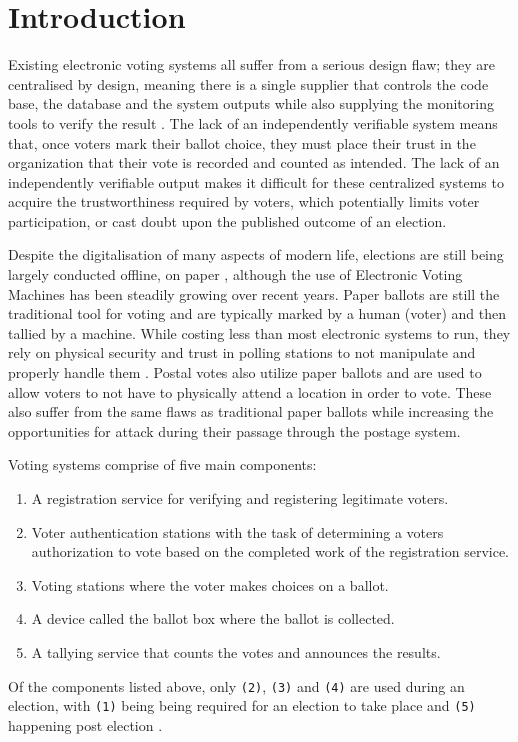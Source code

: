 \documentclass{article}
\begin{document}
    \section{Introduction}
Existing electronic voting systems all suffer from a serious design flaw; they are centralised by design, meaning there is a single supplier that controls the code base, the database and the system outputs while also supplying the monitoring tools to verify the result \citep{3_noizat_2016}. The lack of an independently verifiable system means that, once voters mark their ballot choice, they must place their trust in the organization that their vote is recorded and counted as intended. The lack of an independently verifiable output makes it difficult for these centralized systems to acquire the trustworthiness required by voters, which potentially limits voter participation, or cast doubt upon the published outcome of an election.

Despite the digitalisation of many aspects of modern life, elections are still being largely conducted offline, on paper \citep{43_ernest_2014}, although the use of Electronic Voting Machines has been steadily growing over recent years. Paper ballots are still the traditional tool for voting and are typically marked by a human (voter) and then tallied by a machine. While costing less than most electronic systems to run, they rely on physical security and trust in polling stations to not manipulate and properly handle them \citep{44_wyndham_chen_das_2016}. Postal votes also utilize paper ballots and are used to allow voters to not have to physically attend a location in order to vote. These also suffer from the same flaws as traditional paper ballots while increasing the opportunities for attack during their passage through the postage system.

Voting systems comprise of five main components:
\begin{enumerate}
	\item A registration service for verifying and registering legitimate voters.
	\item Voter authentication stations with the task of determining a voters authorization to vote based on the completed work of the registration service.
	\item Voting stations where the voter makes choices on a ballot.
	\item A device called the ballot box where the ballot is collected.
	\item A tallying service that counts the votes and announces the results.
\end{enumerate}
Of the components listed above, only \verb|(2)|, \verb|(3)| and \verb|(4)| are used during an election, with \verb|(1)| being being required for an election to take place and \verb|(5)| happening post election \citep{48_safevote_2001}.
\end{document}
